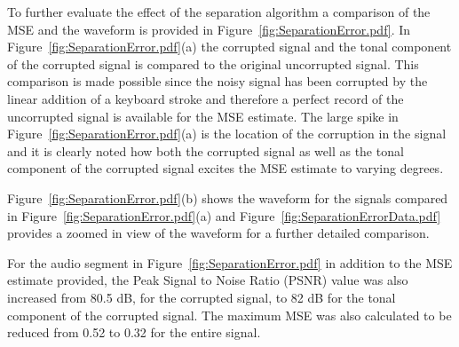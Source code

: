 To further evaluate the effect of the separation algorithm a comparison of the MSE and the waveform is provided in Figure~\ref{fig:SeparationError.pdf}. In Figure~\ref{fig:SeparationError.pdf}(a) the corrupted signal and the tonal component of the corrupted signal is compared to the original uncorrupted signal. This comparison is made possible since the noisy signal has been corrupted by the linear addition of a keyboard stroke and therefore a perfect record of the uncorrupted signal is available for the MSE estimate. The large spike in Figure~\ref{fig:SeparationError.pdf}(a) is the location of the corruption in the signal and it is clearly noted how both the corrupted signal as well as the tonal component of the corrupted signal excites the MSE estimate to varying degrees.

Figure~\ref{fig:SeparationError.pdf}(b) shows the waveform for the signals compared in Figure~\ref{fig:SeparationError.pdf}(a) and Figure~\ref{fig:SeparationErrorData.pdf} provides a zoomed in view of the waveform for a further detailed comparison.

For the audio segment in Figure~\ref{fig:SeparationError.pdf} in addition to the MSE estimate provided, the Peak Signal to Noise Ratio (PSNR) value was also increased from  80.5 dB, for the corrupted signal, to 82 dB for the tonal component of the corrupted signal. The maximum MSE was also calculated to be reduced from 0.52 to 0.32 for the entire signal.

